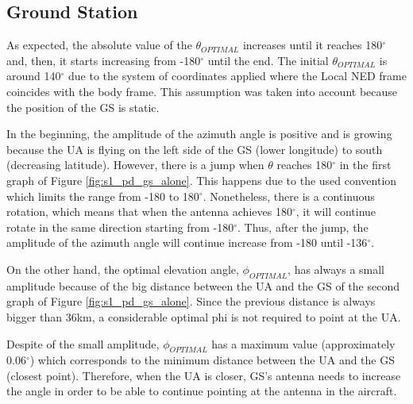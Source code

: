 \subsection{Ground Station}\label{GroundStation_scenario1}
As expected, the absolute value of the $\theta_{OPTIMAL}$ increases until it reaches 180$^{\circ}$  and, then, it starts increasing from -180$^{\circ}$ until the end. The initial $\theta_{OPTIMAL}$ is around 140$^{\circ}$ due to the system of coordinates applied where the Local NED frame coincides with the body frame. This assumption was taken into account because the position of the GS is static.

In the beginning, the amplitude of the azimuth angle is positive and is growing because the UA is flying on the left side of the GS (lower longitude) to south (decreasing latitude). However, there is a jump when $\theta$ reaches 180$^{\circ}$ in the first graph of Figure \ref{fig:s1_pd_gs_alone}. This happens due to the used convention which limits the range from -180 to 180$^{\circ}$. Nonetheless, there is a continuous rotation, which means that when the antenna achieves 180$^{\circ}$, it will continue rotate in the same direction starting from -180$^{\circ}$. Thus, after the jump, the amplitude of the azimuth angle will continue increase from -180 until -136$^{\circ}$.

On the other hand, the optimal elevation angle, $\phi_{OPTIMAL}$, has always a small amplitude because of the big distance between the UA and the GS of the second graph of Figure \ref{fig:s1_pd_gs_alone}. Since the previous distance is always bigger than 36km, a considerable optimal phi is not required to point at the UA. 

Despite of the small amplitude, $\phi_{OPTIMAL}$ has a maximum value (approximately 0.06$^{\circ}$) which corresponds to the minimum distance between the UA and the GS (closest point). Therefore, when the UA is closer, GS’s antenna needs to increase the angle in order to be able to continue pointing at the antenna in the aircraft.

